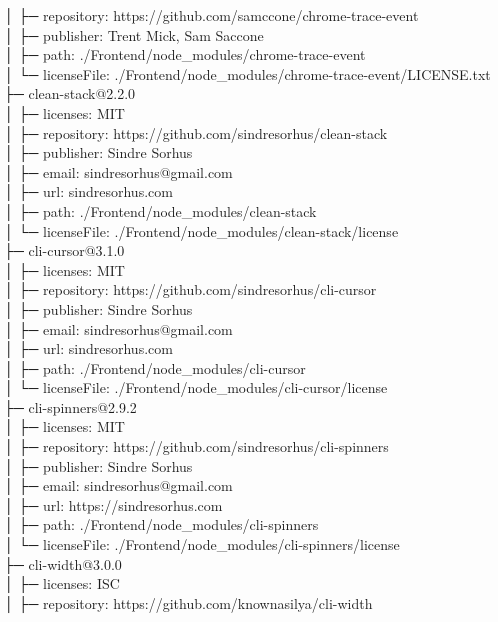 \documentclass[
    paper=a4,
    twoside=false,
    parskip=half,
    listof=entryprefix,
    listof=totoc,
    index=totoc,
    bibliography=totoc,
    headsepline,
]{scrbook}
\begin{document}
    │  ├─ repository: https://github.com/samccone/chrome-trace-event\\
    │  ├─ publisher: Trent Mick, Sam Saccone\\
    │  ├─ path: ./Frontend/node\_modules/chrome-trace-event\\
    │  └─ licenseFile: ./Frontend/node\_modules/chrome-trace-event/LICENSE.txt\\
    ├─ clean-stack@2.2.0\\
    │  ├─ licenses: MIT\\
    │  ├─ repository: https://github.com/sindresorhus/clean-stack\\
    │  ├─ publisher: Sindre Sorhus\\
    │  ├─ email: sindresorhus@gmail.com\\
    │  ├─ url: sindresorhus.com\\
    │  ├─ path: ./Frontend/node\_modules/clean-stack\\
    │  └─ licenseFile: ./Frontend/node\_modules/clean-stack/license\\
    ├─ cli-cursor@3.1.0\\
    │  ├─ licenses: MIT\\
    │  ├─ repository: https://github.com/sindresorhus/cli-cursor\\
    │  ├─ publisher: Sindre Sorhus\\
    │  ├─ email: sindresorhus@gmail.com\\
    │  ├─ url: sindresorhus.com\\
    │  ├─ path: ./Frontend/node\_modules/cli-cursor\\
    │  └─ licenseFile: ./Frontend/node\_modules/cli-cursor/license\\
    ├─ cli-spinners@2.9.2\\
    │  ├─ licenses: MIT\\
    │  ├─ repository: https://github.com/sindresorhus/cli-spinners\\
    │  ├─ publisher: Sindre Sorhus\\
    │  ├─ email: sindresorhus@gmail.com\\
    │  ├─ url: https://sindresorhus.com\\
    │  ├─ path: ./Frontend/node\_modules/cli-spinners\\
    │  └─ licenseFile: ./Frontend/node\_modules/cli-spinners/license\\
    ├─ cli-width@3.0.0\\
    │  ├─ licenses: ISC\\
    │  ├─ repository: https://github.com/knownasilya/cli-width\\
\end{document}
